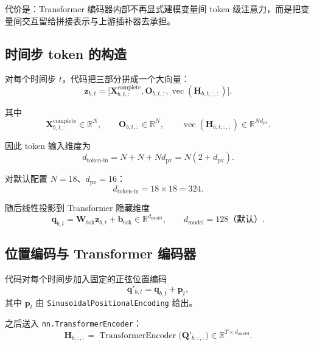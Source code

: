 \documentclass[UTF8]{ctexart}
\newcommand{\vect}[1]{\operatorname{vec}\!\left(#1\right)}
\begin{document}
代价是：Transformer 编码器内部不再显式建模变量间 token 级注意力，而是把变量间交互留给拼接表示与上游插补器去承担。

\subsection{时间步 token 的构造}

对每个时间步 \(t\)，代码把三部分拼成一个大向量：
\begin{equation}
    \bm{z}_{b,t}
    =
    \Big[
        \bm{X}^{\text{complete}}_{b,t,:},
        \bm{O}_{b,t,:},
        \vect{\bm{H}_{b,t,:,:}}
    \Big].
\end{equation}

其中
\begin{equation}
    \bm{X}^{\text{complete}}_{b,t,:}\in\mathbb{R}^{N},
    \qquad
    \bm{O}_{b,t,:}\in\mathbb{R}^{N},
    \qquad
    \vect{\bm{H}_{b,t,:,:}}\in\mathbb{R}^{N d_{\text{pv}}}.
\end{equation}

因此 token 输入维度为
\begin{equation}
    d_{\text{token-in}} = N + N + N d_{\text{pv}} = N(2+d_{\text{pv}}).
\end{equation}

对默认配置 \(N=18\)、\(d_{\text{pv}}=16\)：
\begin{equation}
    d_{\text{token-in}} = 18\times 18 = 324.
\end{equation}

随后线性投影到 Transformer 隐藏维度
\begin{equation}
    \bm{q}_{b,t} = \bm{W}_{\text{tok}}\bm{z}_{b,t} + \bm{b}_{\text{tok}}
    \in \mathbb{R}^{d_{\text{model}}},
    \qquad
    d_{\text{model}} = 128 \text{（默认）}.
\end{equation}

\subsection{位置编码与 Transformer 编码器}

代码对每个时间步加入固定的正弦位置编码
\begin{equation}
    \bm{q}'_{b,t} = \bm{q}_{b,t} + \bm{p}_t,
\end{equation}
其中 \(\bm{p}_t\) 由 \texttt{SinusoidalPositionalEncoding} 给出。

之后送入 \texttt{nn.TransformerEncoder}：
\begin{equation}
    \bm{H}_{b,:,:}
    =
    \operatorname{TransformerEncoder}
    \big(
        \bm{Q}'_{b,:,:}
    \big)
    \in \mathbb{R}^{T \times d_{\text{model}}}.
\end{equation}
\end{document}
